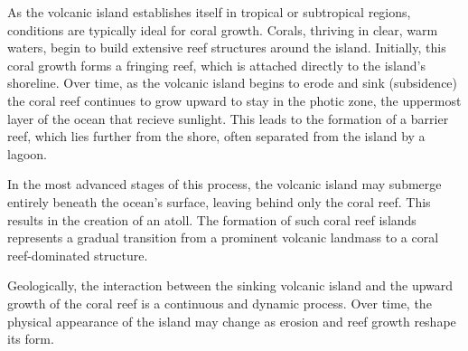 As the volcanic island establishes itself in tropical or subtropical regions, conditions are typically ideal for coral growth. Corals, thriving in clear, warm waters, begin to build extensive reef structures around the island. Initially, this coral growth forms a fringing reef, which is attached directly to the island's shoreline. Over time, as the volcanic island begins to erode and sink (subsidence) the coral reef continues to grow upward to stay in the photic zone, the uppermost layer of the ocean that recieve sunlight. This leads to the formation of a barrier reef, which lies further from the shore, often separated from the island by a lagoon.

In the most advanced stages of this process, the volcanic island may submerge entirely beneath the ocean's surface, leaving behind only the coral reef. This results in the creation of an atoll. The formation of such coral reef islands represents a gradual transition from a prominent volcanic landmass to a coral reef-dominated structure. 

Geologically, the interaction between the sinking volcanic island and the upward growth of the coral reef is a continuous and dynamic process. Over time, the physical appearance of the island may change as erosion and reef growth reshape its form.


